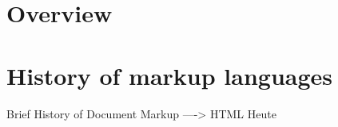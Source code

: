 





\section{Overview}



\section{History of markup languages}

Brief History of Document Markup ----> HTML Heute